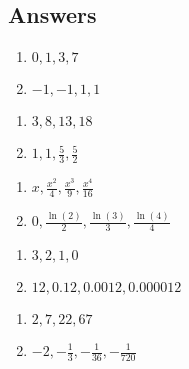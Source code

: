 \newpage

\subsection{Answers}

\begin{multicols}{2}
\begin{enumerate}

\item $0, 1, 3, 7$
\item $-1, -1, 1, 1$

\setcounter{HW}{\value{enumi}}
\end{enumerate}
\end{multicols}

\begin{multicols}{2}
\begin{enumerate}
\setcounter{enumi}{\value{HW}}

\item $3, 8, 13, 18$
\item $1, 1, \frac{5}{3}, \frac{5}{2}$

\setcounter{HW}{\value{enumi}}
\end{enumerate}
\end{multicols}

\begin{multicols}{2}
\begin{enumerate}
\setcounter{enumi}{\value{HW}}

\item $x, \frac{x^{2}}{4}, \frac{x^{3}}{9}, \frac{x^{4}}{16}$
\item $0, \frac{\ln(2)}{2}, \frac{\ln(3)}{3}, \frac{\ln(4)}{4}$

\setcounter{HW}{\value{enumi}}
\end{enumerate}
\end{multicols}

\begin{multicols}{2}
\begin{enumerate}
\setcounter{enumi}{\value{HW}}

\item $3, 2, 1, 0$
\item $12, 0.12, 0.0012, 0.000012$

\setcounter{HW}{\value{enumi}}
\end{enumerate}
\end{multicols}

\begin{multicols}{2}
\begin{enumerate}
\setcounter{enumi}{\value{HW}}

\item $2, 7, 22, 67$
\item $-2, -\frac{1}{3}, -\frac{1}{36}, -\frac{1}{720}$

\setcounter{HW}{\value{enumi}}
\end{enumerate}
\end{multicols}


